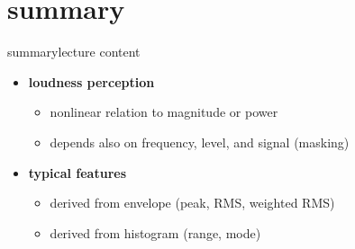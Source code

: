     \section{summary}
        \begin{frame}{summary}{lecture content}
            \begin{itemize}
                \item   \textbf{loudness perception}
                    \begin{itemize}
                        \item   nonlinear relation to magnitude or power
                        \item   depends also on frequency, level, and signal (masking)
                    \end{itemize}
                \bigskip
                \item   \textbf{typical features}
                    \begin{itemize}
                        \item   derived from envelope (peak, RMS, weighted RMS)
                        \item   derived from histogram (range, mode)
                    \end{itemize}
            \end{itemize}
        \end{frame}

